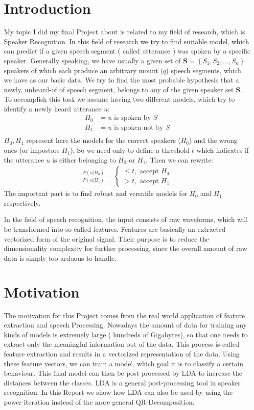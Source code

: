 \section{Introduction}
My topic I did my final Project about is related to my field of research, which is Speaker Recognition. In this field of research we try to find suitable model, which can predict if a given speech segment ( called utterance ) was spoken by a specific speaker. 
Generally speaking, we have usually a given set of $\mathbf{S} = \left\lbrace S_1 , S_2 , \ldots , S_n \right\rbrace$ speakers of which each produce an arbitrary mount ($q$) speech segments, which we have as our basic data. We try to find the most probable hypothesis that a newly, unheard-of of speech segment, belongs to any of the given speaker set $\mathbf{S}$.
To accomplish this task we assume having two different models, which try to identify a newly heard utterance $u$:
\begin{align*}
H_0 &= u \text{ is spoken by } S\\
H_1 &= u \text{ is spoken not by } S\\
\end{align*}
$H_0,H_1$ represent here the models for the correct speakers ($H_0$) and the wrong ones (or impostors $H_1$).
So we need only to define a threshold $t$ which indicates if the utterance $u$ is either belonging to $H_0$ or $H_1$. Then we can rewrite:
\begin{gather*}
\frac{P(u|H_0)}{P(u|H_1)} = \begin{cases}
\leq t, \text{ accept } H_0\\
> t , \text{ accept } H_1
\end{cases}
\end{gather*}
The important part is to find robust and versatile models for $H_0$ and $H_1$ respectively.

In the field of speech recognition, the input consists of raw waveforms, which will be transformed into so called features. Features are basically an extracted vectorized form of the original signal. Their purpose is to reduce the dimensionality complexity for further processing, since the overall amount of raw data is simply too arduous to handle.

\section{Motivation}

The motivation for this Project comes from the real world application of feature extraction and speech Processing. Nowadays the amount of data for training any kinds of models is extremely large ( hundreds of Gigabytes), so that one needs to extract only the meaningful information out of the data. This process is called feature extraction and results in a vectorized representation of the data. Using these feature vectors, we can train a model, which goal it is to classify a certain behaviour. This final model can then be post-processed by LDA to increase the distances between the classes. 
LDA is a general post-processing tool in speaker recognition. In this Report we show how LDA can also be used by using the power iteration instead of the more general QR-Decomposition.

